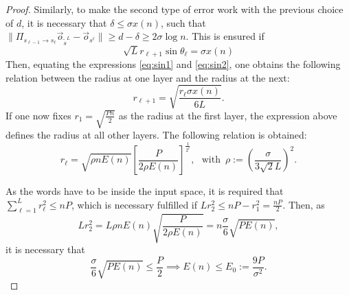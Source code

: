 \documentclass[10pt,conference]{IEEEtran}
\newcommand{\1}{\mathds{1}}
\begin{document}
\begin{proof}
Similarly, to make the second type of error work with the previous choice of $d$, it is necessary that $\delta\leq \sigma x(n)$, such that $\|\Pi_{s_{\ell-1}\to s_{\ell}}\vec{o}_{\tilde{s}^{L}}-\vec{o}_{s^\ell}\|\geq d-\delta\geq 2\sigma\log n$. This is ensured if 
\begin{equation}\label{eq:sin2}
\sqrt{L}r_{\ell+1}\sin\theta_\ell=\sigma x(n)
\end{equation}
Then, equating the expressions \eqref{eq:sin1} and \eqref{eq:sin2}, one obtains the following relation between the radius at one layer and the radius at the next:
\begin{equation}\label{eq:RR_hierarchy}
    r_{\ell+1}=\sqrt{\frac{r_\ell\sigma x(n)}{6L}}.
\end{equation}
If one now fixes $r_1=\sqrt{\frac{Pn}{2}}$ as the radius at the first layer, the expression above defines the radius at all other layers. The following relation is obtained:
\begin{equation}\label{eq:RR_radius}
r_\ell = \sqrt{\rho n E(n)}\left[\frac{P}{2\rho E(n)}\right]^\frac{1}{2^\ell}\!\!,\,\,\,\,\text{with}\,\,\,\rho:=\left(\frac{\sigma}{3\sqrt{2}L}\right)^2\!\!.
\end{equation}

As the words have to be inside the input space, it is required that $\sum_{\ell=1}^L r_\ell^2\leq nP$, which is necessary fulfilled if $L r_2^2\leq nP-r_1^2=\frac{nP}{2}$. Then, as
\begin{equation}
L r_2^2=L\rho n E(n)\sqrt{\frac{P}{2\rho E(n)}}=n\frac{\sigma}{6}\sqrt{PE(n)},
\end{equation}
it is necessary that
\begin{equation}
\frac{\sigma}{6}\sqrt{PE(n)}\leq\frac{P}{2}\implies E(n)\leq E_0:=\frac{9P}{\sigma^2}.
\end{equation}


\end{proof}
\end{document}
